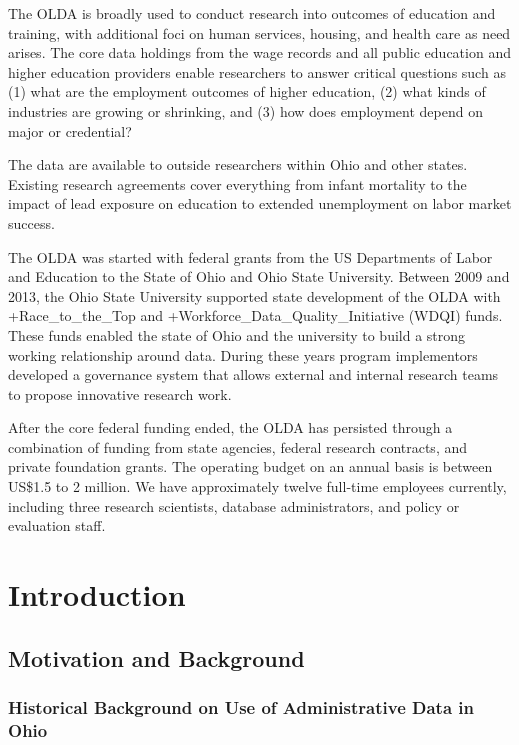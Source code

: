 \documentclass[
]{book}
\begin{document}
The OLDA is broadly used to conduct research into outcomes of education and training, with additional foci on human services, housing, and health care as need arises. The core data holdings from the wage records and all public education and higher education providers enable researchers to answer critical questions such as (1) what are the employment outcomes of higher education, (2) what kinds of industries are growing or shrinking, and (3) how does employment depend on major or credential?

The data are available to outside researchers within Ohio and other states. Existing research agreements cover everything from infant mortality to the impact of lead exposure on education to extended unemployment on labor market success.

The OLDA was started with federal grants from the US Departments of Labor and Education to the State of Ohio and Ohio State University. Between 2009 and 2013, the Ohio State University supported state development of the OLDA with +Race\_to\_the\_Top\textbar{} and +Workforce\_Data\_Quality\_Initiative\textbar{} (WDQI) funds. These funds enabled the state of Ohio and the university to build a strong working relationship around data. During these years program implementors developed a governance system that allows external and internal research teams to propose innovative research work.

After the core federal funding ended, the OLDA has persisted through a combination of funding from state agencies, federal research contracts, and private foundation grants. The operating budget on an annual basis is between US\$1.5 to 2 million. We have approximately twelve full-time employees currently, including three research scientists, database administrators, and policy or evaluation staff.

\hypertarget{introduction-2}{%
\section{Introduction}\label{introduction-2}}

\hypertarget{motivation-and-background-1}{%
\subsection{Motivation and Background}\label{motivation-and-background-1}}

\hypertarget{historical-background-on-use-of-administrative-data-in-ohio}{%
\subsubsection*{Historical Background on Use of Administrative Data in Ohio}\label{historical-background-on-use-of-administrative-data-in-ohio}}
\end{document}
